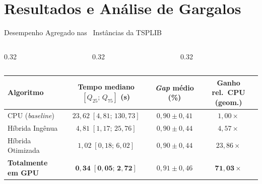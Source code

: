 
\section{Resultados e Análise de Gargalos}

\begin{frame}{Desempenho Agregado nas \totalinstancias\ Instâncias da TSPLIB}
  \begin{columns}[T,onlytextwidth]
    \begin{column}{0.32\textwidth}
    \end{column}
    \begin{column}{0.32\textwidth}
    \end{column}
    \begin{column}{0.32\textwidth}
    \end{column}
  \end{columns}

  \begin{slidetabela}[0.40\textheight]
    \begin{tabular}{@{}lccc@{}}
      \toprule
      \textbf{Algoritmo} & \textbf{Tempo mediano $[Q_{25};\, Q_{75}]$ (s)} & \textbf{\emph{Gap} médio (\%)} & \textbf{Ganho rel.\ CPU (geom.)} \\
      \midrule
      CPU (\emph{baseline})      & $23{,}62\;[4{,}81;\, 130{,}73]$        & $0{,}90 \pm 0{,}41$ & $1{,}00\times$ \\
      Híbrida Ingênua            & $4{,}81\;[1{,}17;\, 25{,}76]$          & $0{,}90 \pm 0{,}44$ & $4{,}57\times$ \\
      Híbrida Otimizada          & $1{,}02\;[0{,}18;\, 6{,}02]$           & $0{,}90 \pm 0{,}44$ & $23{,}86\times$ \\
      \rowcolor{ufscGreenLight}
      \textbf{Totalmente em GPU} & $\mathbf{0{,}34\;[0{,}05;\, 2{,}72]}$  & $0{,}91 \pm 0{,}46$ & $\mathbf{71{,}03\times}$ \\
      \bottomrule
    \end{tabular}
  \end{slidetabela}
\end{frame}

